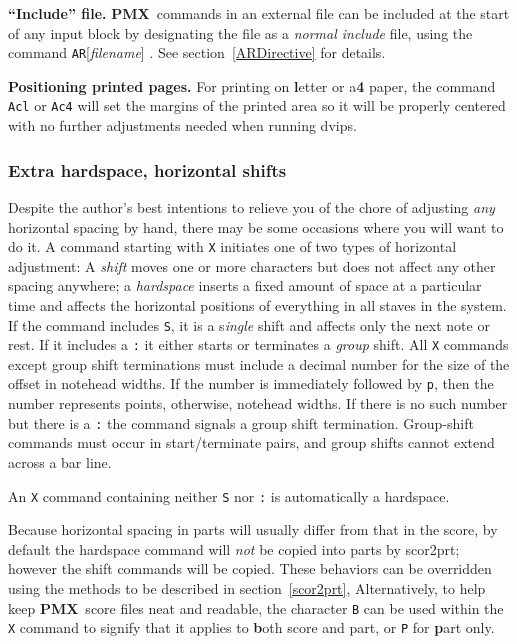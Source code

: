 \documentclass[11pt]{article}
\newcommand\PMXX{\textbf{PMX}}
\newcommand\PMX{\PMXX~}
\def\newfrom{2.59}  %
\def\NEW#1{\ifdim#1 pt<\newfrom pt\else%
\marginpar{\fbox{#1}}\fi}
\begin{document}
{\bf ``Include'' file.}
\PMX commands \NEW{2.5}in an external file can be included at the start of any input 
block by designating the file as a {\it normal include} file, using the 
command {\tt AR}[{\it filename}] . See section~\ref{ARDirective} for details.

{\bf Positioning printed pages.}
For \NEW{2.7} printing on {\bf l}etter or a{\bf 4} paper, the command {\tt Acl} or 
{\tt Ac4} will set the margins
of the printed area so it will be properly centered with no further
adjustments needed when running {\bfx dvips}.

\subsubsection{Extra hardspace, horizontal shifts} \label{hardspace}

	Despite the author's best intentions to relieve you of the chore 
of adjusting {\it any} horizontal spacing by hand, there may be some occasions 
where you 
will want to do it.  A command starting with {\tt X} initiates one of two 
types of horizontal adjustment: A {\it shift} moves one or more 
characters but does not affect any other spacing anywhere; a 
{\it hardspace} inserts a fixed amount of space at a particular time and
affects the horizontal positions of everything in all staves in the system. 
If the command includes {\tt S}, it is a {\bfi s}{\it ingle} shift and affects 
only the next note or rest.  If it includes a {\tt :} it either starts or 
terminates a {\it group} shift.  
All {\tt X} commands except group shift terminations 
must include a decimal number for the size of the offset in notehead widths. 
If the number is immediately followed by
{\tt p}, then the number represents points, otherwise, notehead widths.
If there is no such number but there is a {\tt :} the command 
signals a group shift termination.  
Group-shift commands must occur in 
start/terminate pairs, and group shifts cannot extend across a bar line.

An {\tt X} command containing neither {\tt S} nor {\tt :} is 
automatically a hardspace.  

Because horizontal spacing in parts will usually differ from that in the 
score, by default the hardspace command will {\it not} be copied into parts 
by {\bfx scor2prt}; however the shift commands will be copied.  
These behaviors can be overridden using the methods to be described in 
section~\ref{scor2prt},  Alternatively, \NEW{1.42} to help keep \PMX score 
files neat 
and readable, the character {\tt B} can be used within the {\tt X} command 
to signify that it applies to {\bf b}oth score and part, or {\tt P} for
{\bf p}art only.
\end{document}

